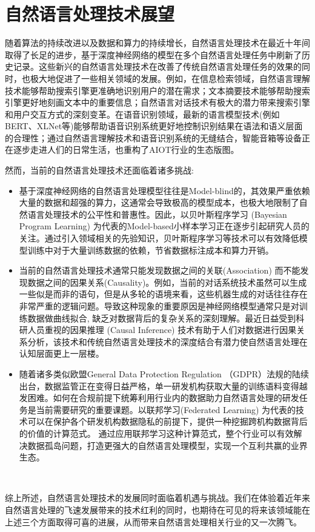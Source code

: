 %
%
%
\chapter{自然语言处理技术展望}
\label{prospect}

随着算法的持续改进以及数据和算力的持续增长，自然语言处理技术在最近十年间取得了长足的进步，基于深度神经网络的模型在多个自然语言处理任务中刷新了历史记录。这些新兴的自然语言处理技术在改善了传统自然语言处理任务的效果的同时，也极大地促进了一些相关领域的发展。例如，在信息检索领域，自然语言理解技术能够帮助搜索引擎更准确地识别用户的潜在需求；文本摘要技术能够帮助搜索引擎更好地刻画文本中的重要信息；自然语言对话技术有极大的潜力带来搜索引擎和用户交互方式的深刻变革。在语音识别领域，最新的语言模型技术(例如BERT、XLNet等\cite{devlin2018bert, yang2019xlnet, song2019topic})能够帮助语音识别系统更好地控制识别结果在语法和语义层面的合理性；通过自然语言理解技术和语音识别系统的无缝结合，智能音箱等设备正在逐步走进人们的日常生活，也重构了AIOT行业的生态版图。

然而，当前的自然语言处理技术还面临着诸多挑战:

\begin{itemize}
  \item 基于深度神经网络的自然语言处理模型往往是Model-blind的，其效果严重依赖大量的数据和超强的算力，这通常会导致极高的模型成本，也极大地限制了自然语言处理技术的公平性和普惠性。因此，以贝叶斯程序学习 (Bayesian Program Learning) \cite{lake2015human}为代表的Model-based小样本学习正在逐步引起研究人员的关注。通过引入领域相关的先验知识，贝叶斯程序学习等技术可以有效降低模型训练中对于大量训练数据的依赖，节省数据标注成本和算力开销。
  \item 当前的自然语言处理技术通常只能发现数据之间的关联(Association) 而不能发现数据之间的因果关系(Causality)。例如，当前的对话系统技术虽然可以生成一些似是而非的语句，但是从多轮的语境来看，这些机器生成的对话往往存在非常严重的逻辑问题。导致这种现象的重要原因是神经网络模型通常只是对训练数据做曲线拟合, 缺乏对数据背后的复杂关系的深刻理解。最近日益受到科研人员重视的因果推理 (Causal Inference) \cite{pearl2010introduction} 技术有助于人们对数据进行因果关系分析，该技术和传统自然语言处理技术的深度结合有潜力使自然语言处理在认知层面更上一层楼。
  \item 随着诸多类似欧盟General Data Protection Regulation （GDPR）法规的陆续出台，数据监管正在变得日益严格，单一研发机构获取大量的训练语料变得越发困难。如何在合规前提下统筹利用行业内的数据助力自然语言处理的研发任务是当前需要研究的重要课题。以联邦学习(Federated Learning) \cite{yang2019federated, jiang2019federated} 为代表的技术可以在保护各个研发机构数据隐私的前提下，提供一种挖掘跨机构数据背后的价值的计算范式。 通过应用联邦学习这种计算范式，整个行业可以有效解决数据孤岛问题，打造更强大的自然语言处理模型，实现一个互利共赢的业界生态。
\end{itemize}


综上所述，自然语言处理技术的发展同时面临着机遇与挑战。我们在体验着近年来自然语言处理的飞速发展带来的技术红利的同时，也期待在可见的将来该领域能在上述三个方面取得可喜的进展，从而带来自然语言处理相关行业的又一次腾飞。


